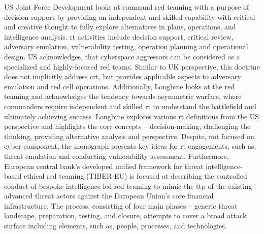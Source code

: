 %
US Joint Force Development \cite{USJCS2016} looks at command red teaming with a purpose of decision support by providing an independent and skilled capability with critical and creative thought to fully explore alternatives in plans, operations, and intelligence analysis. \gls{rt} activities include decision support, critical review, adversary emulation, vulnerability testing, operation planning and operational design. US acknowledges, that cyberspace aggressors can be considered as a specialized and highly-focused red teams. Similar to UK perspective, this doctrine does not implicitly address \gls{crt}, but provides applicable aspects to adversary emulation and red cell operations.
%
%
%
Additionally, Longbine \cite{Longbine2008} looks at the red teaming and acknowledges the tendency towards asymmetric warfare, where commanders require independent and skilled \gls{rt} to understand the battlefield and ultimately achieving success. Longbine explores various \gls{rt} definitions from the US perspective and highlights the core concepts -- decision-making, challenging the thinking, providing alternative analysis and perspective. Despite, not focused on cyber component, the monograph presents key ideas for \gls{rt} engagements, such as, threat emulation and conducting vulnerability assessment.
Furthermore, European central bank's developed unified framework for threat intelligence-based ethical red teaming (TIBER-EU) \cite{ECB2018} is focused at describing the controlled conduct of bespoke intelligence-led red teaming to mimic the \gls{ttp} of the existing advanced threat actors against the European Union's core financial infrastructure. The process, consisting of four main phases -- generic threat landscape, preparation, testing, and closure, attempts to cover a broad attack surface including elements, such as, people, processes, and technologies.

